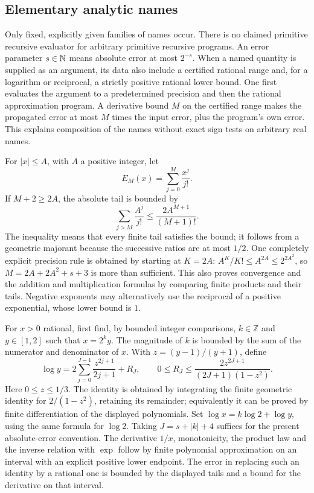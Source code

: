 \subsection{Elementary analytic names}\label{subsec:names}

Only fixed, explicitly given families of names occur.  There is no claimed
primitive recursive evaluator for arbitrary primitive recursive programs.
An error parameter $s\in\mathbb N$ means absolute error at most $2^{-s}$.
When a named quantity is supplied as an argument, its data also include a
certified rational range and, for a logarithm or reciprocal, a strictly
positive rational lower bound. One first evaluates the argument to a
predetermined precision and then the rational approximation program. A
derivative bound $M$ on the certified range makes the propagated error at
most $M$ times the input error, plus the program's own error. This explains
composition of the names without exact sign tests on arbitrary real names.

For $|x|\le A$, with $A$ a positive integer, let
\[
 E_M(x)=\sum_{j=0}^{M}\frac{x^j}{j!}.
\]
If $M+2\ge2A$, the absolute tail is bounded by
\begin{equation}\label{eq:exp-tail}
 \sum_{j>M}\frac{A^j}{j!}\le
 \frac{2A^{M+1}}{(M+1)!}.
\end{equation}
The inequality means that every finite tail satisfies the bound; it follows
from a geometric majorant because the successive ratios are at most $1/2$.
One completely explicit precision rule is obtained by starting at $K=2A$:
$A^K/K!\le A^{2A}\le2^{2A^2}$, so
$M=2A+2A^2+s+3$ is more than sufficient.  This also proves convergence and the
addition and multiplication formulas by comparing finite products and their
tails.  Negative exponents may alternatively use the reciprocal of a positive
exponential, whose lower bound is $1$.

For $x>0$ rational, first find, by bounded integer comparisons, $k\in\mathbb Z$
and $y\in[1,2]$ such that $x=2^k y$.  The magnitude of $k$ is bounded by the sum
of the numerator and denominator of $x$.  With $z=(y-1)/(y+1)$, define
\begin{equation}\label{eq:log-series}
 \log y=2\sum_{j=0}^{J-1}\frac{z^{2j+1}}{2j+1}+R_J,
 \qquad
 0\le R_J\le\frac{2z^{2J+1}}{(2J+1)(1-z^2)}.
\end{equation}
Here $0\le z\le1/3$.  The identity is obtained by integrating the finite
geometric identity for $2/(1-z^2)$, retaining its remainder; equivalently it
can be proved by finite differentiation of the displayed polynomials.  Set
$\log x=k\log2+\log y$, using the same formula for $\log2$.  Taking
$J=s+|k|+4$ suffices for the present absolute-error convention.  The derivative
$1/x$, monotonicity, the product law and the inverse relation with $\exp$ follow
by finite polynomial approximation on an interval with an explicit positive
lower endpoint.  The error in replacing such an identity by a rational one is
bounded by the displayed tails and a bound for the derivative on that interval.

